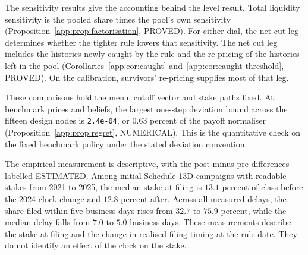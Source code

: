 \documentclass[11pt]{article}
\begin{document}
The sensitivity results give the accounting behind the level result. Total liquidity sensitivity
is the pooled share times the pool's own sensitivity (Proposition~\ref{app:prop:factorisation},
PROVED). For either dial, the net cut leg determines whether the tighter rule lowers that
sensitivity. The net cut leg includes the histories newly caught by the rule and the re-pricing of
the histories left in the pool (Corollaries~\ref{app:cor:caught}
and~\ref{app:cor:caught-threshold}, PROVED). On the calibration, survivors' re-pricing supplies most
of that leg.

These comparisons hold the menu, cutoff vector and stake paths fixed. At benchmark prices and
beliefs, the largest one-step deviation bound across the fifteen design nodes is
\texttt{2.4e-04}, or 0.63 percent of the payoff normaliser (Proposition~\ref{app:prop:regret},
NUMERICAL). This is the quantitative check on the fixed benchmark policy under the stated
deviation convention.

The empirical measurement is descriptive, with the post-minus-pre differences labelled ESTIMATED.
Among initial Schedule 13D campaigns with readable stakes from 2021 to 2025, the median stake at
filing is $13.1$ percent of class before the 2024 clock change and $12.8$ percent after. Across all
measured delays, the share filed within five business days rises from $32.7$ to $75.9$ percent, while
the median delay falls from $7.0$ to $5.0$ business days. These measurements describe the stake at
filing and the change in realised filing timing at the rule date. They do not identify an effect of the
clock on the stake.

\printbibliography
\end{document}
